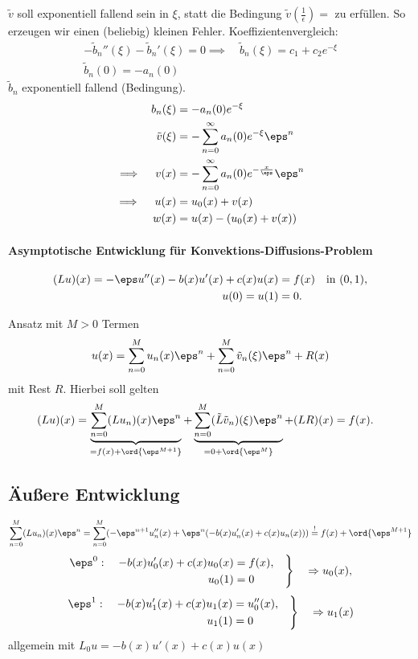 \begin{beispiel*}
  $\tilde v$ soll exponentiell fallend sein in $\xi$, statt die Bedingung $\tilde v(\frac 1 \epsilon) = $ zu erfüllen. So erzeugen wir einen (beliebig) kleinen Fehler. Koeffizientenvergleich:
  \begin{align*}
    -\tilde b_{n}''(\xi) - \tilde b_{n}'(\xi) = 0 \implies \quad \tilde b_{n}(\xi) = c_{1} + c_{2}e^{-\xi}\\
    \tilde b_{n}(0) = - a_{n}(0)
  \end{align*}
  $\tilde b_{n}$ exponentiell fallend (Bedingung).
  \begin{align*}
    b_{n}(\xi) &= - a_{n}(0)e^{-\xi}\\
    \tilde v (\xi) &= - \sum_{n = 0}^{\infty}a_{n}(0) e^{-\xi} \eps^{n} \\
    \implies \quad v(x) &= - \sum_{n = 0}^{\infty} a_{n}(0) e^{- \frac x \eps} \eps^{n}\\
    \implies \quad u(x) &= u_{0}(x) + v(x)\\
    w(x) &= u(x) - (u_{0}(x) + v(x))
  \end{align*}

\end{beispiel*}


\paragraph{Asymptotische Entwicklung für Konvektions-Diffusions-Problem}
\label{sec:asympt-entw-fur-konv}




\begin{align*}
  (Lu)(x)=-\eps u''(x)-b(x) u'(x)+c(x)u(x)&=f(x)\quad\mbox{in }(0,1),\\
  u(0)=u(1)&=0.
\end{align*}


Ansatz mit $M>0$ Termen
\[
u(x)=\sum_{n=0}^Mu_n(x)\eps^n+\sum_{n=0}^M\tilde v_n(\xi)\eps^n+R(x)
\]
mit Rest $R$. Hierbei soll gelten
\begin{align*}
  (Lu)(x)= \underbrace{\sum_{n=0}^M(Lu_n)(x)\eps^n}_{=f(x)+\ord{\eps^{M+1}}}
  +\underbrace{\sum_{n=0}^M(\tilde L\tilde v_n)(\xi)\eps^n}_{=0+\ord{\eps^{M}}}+(LR)(x)&=f(x).
\end{align*}
\subsection*{Äußere Entwicklung}
\[
\sum_{n=0}^M(Lu_n)(x)\eps^n
= \sum_{n=0}^M(-\eps^{n+1} u''_n(x)+\eps^n(-b(x)u'_n(x)+c(x)u_n(x)))\stackrel{!}{=}f(x)+\ord{\eps^{M+1}}
\]
\[
\left.
  \begin{aligned}
    \eps^0:\quad -b(x)u'_0(x)+c(x)u_0(x) &= f(x),\\
    u_0(1) &= 0
  \end{aligned}\quad
\right\}\quad\Rightarrow
u_0(x),
\]
\[
\left.
  \begin{aligned}
    \eps^1:\quad -b(x)u'_1(x)+c(x)u_1(x) &= u''_0(x),\\
    u_1(1) &= 0
  \end{aligned}\quad
\right\}\quad\Rightarrow
u_1(x)
\]
allgemein mit $L_0u=-b(x)u'(x)+c(x)u(x)$

